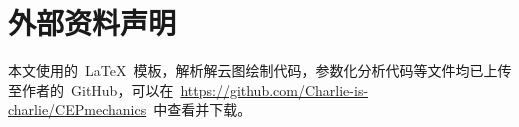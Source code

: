\chapter{外部资料声明}
\label{cha:statement}
本文使用的~\LaTeX{}~模板，解析解云图绘制代码，参数化分析代码等文件均已上传至作者的~GitHub，可以在~\url{https://github.com/Charlie-is-charlie/CEPmechanics}~中查看并下载。
